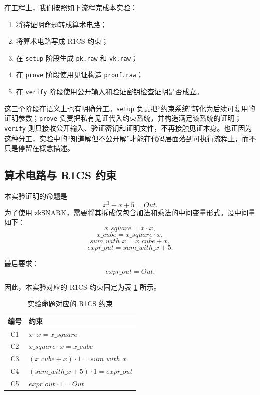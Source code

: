 \documentclass[UTF8,a4paper,10pt]{ctexart}
\begin{document}
在工程上，我们按照如下流程完成本实验：
\begin{enumerate}
    \item 将待证明命题转成算术电路；
    \item 将算术电路写成 R1CS 约束；
    \item 在 \texttt{setup} 阶段生成 \texttt{pk.raw} 和 \texttt{vk.raw}；
    \item 在 \texttt{prove} 阶段使用见证构造 \texttt{proof.raw}；
    \item 在 \texttt{verify} 阶段使用公开输入和验证密钥检查证明是否成立。
\end{enumerate}

这三个阶段在语义上也有明确分工。\texttt{setup} 负责把“约束系统”转化为后续可复用的证明参数；\texttt{prove} 负责把私有见证代入约束系统，并构造满足该系统的证明；\texttt{verify} 则只接收公开输入、验证密钥和证明文件，不再接触见证本身。也正因为这种分工，实验中的“知道解但不公开解”才能在代码层面落到可执行流程上，而不只是停留在概念描述。

\subsection{算术电路与 R1CS 约束}
本实验证明的命题是
\[
x^3 + x + 5 = Out.
\]
为了使用 zkSNARK，需要将其拆成仅包含加法和乘法的中间变量形式。设中间量如下：
\[
x\_square = x \cdot x,
\]
\[
x\_cube = x\_square \cdot x,
\]
\[
sum\_with\_x = x\_cube + x,
\]
\[
expr\_out = sum\_with\_x + 5.
\]

最后要求：
\[
expr\_out = Out.
\]

因此，本实验对应的 R1CS 约束固定为表 \ref{tab:r1cs} 所示。

\begin{table}[H]
    \centering
    \begin{tabular}{cl}
        \toprule
        编号 & 约束 \\
        \midrule
        C1 & $x \cdot x = x\_square$ \\
        C2 & $x\_square \cdot x = x\_cube$ \\
        C3 & $(x\_cube + x)\cdot 1 = sum\_with\_x$ \\
        C4 & $(sum\_with\_x + 5)\cdot 1 = expr\_out$ \\
        C5 & $expr\_out \cdot 1 = Out$ \\
        \bottomrule
    \end{tabular}
    \caption{实验命题对应的 R1CS 约束}
    \label{tab:r1cs}
\end{table}
\end{document}
